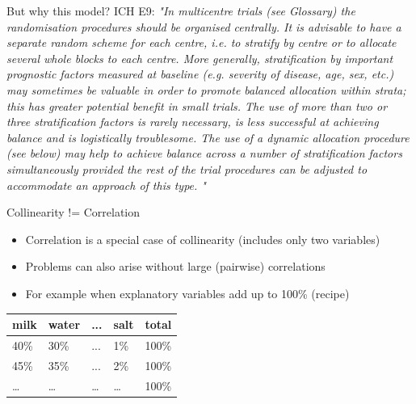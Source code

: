 \documentclass[english]{beamer}\usepackage[]{graphicx}\usepackage[]{xcolor}
\begin{document}
\begin{frame}[plain]{But why this model?}
ICH E9:
\textit{
\tiny{
"In multicentre trials (see Glossary) the randomisation procedures should be organised centrally. It is advisable to have a separate random scheme for each centre, i.e. to stratify by centre or to allocate several whole blocks to each centre. More generally, stratification by important prognostic factors measured at baseline (e.g. severity of disease, age, sex, etc.) may sometimes be valuable in order to promote balanced allocation within strata; this has greater potential benefit in small trials. The use of more than two or three stratification factors is rarely necessary, is less successful at achieving balance and is logistically troublesome. The use of a dynamic allocation procedure (see below) may help to achieve balance across a number of stratification factors simultaneously provided the rest of the trial procedures can be adjusted to accommodate an approach of this type.}\footnotesize{
"
}
}

\end{frame}
\begin{frame}{Collinearity != Correlation}

\begin{itemize}
\item Correlation is a special case of collinearity (includes only two variables)
\item Problems can also arise without large (pairwise) correlations
\item For example when explanatory variables add up to 100\% (recipe)
\end{itemize}


\begin{table}[]
\centering
\begin{tabular}{|l|l|l|l|l|}
\hline
milk & water & ... & salt & total\\ 
\hline
40\% & 30\%  & ... & 1\%  & 100\%\\ 
45\% & 35\%  & ... & 2\%  & 100\%\\
\dots& \dots  & \dots & \dots & 100\% \\ \hline
\end{tabular}%
\end{table}




\end{frame}
\end{document}
